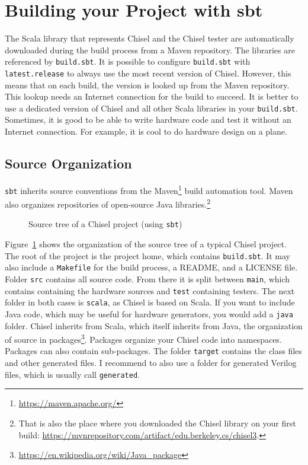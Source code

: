 \documentclass[%
    10pt,
    headinclude, footexclude,
    openright, %
    notitlepage,
    cleardoubleempty,
    headsepline,
    pointlessnumbers,
    bibtotoc, idxtotoc,
    ]{scrbook}
\newcommand{\code}[1]{{\lstinline[basicstyle=\small\ttfamily]{#1}}}
\newcommand{\myref}[2]{\href{#1}{#2}}
\renewcommand{\myref}[2]{{#2}{\footnote{\url{#1}}}}
\begin{document}
\section{Building your Project with sbt}


The Scala library that represents Chisel and the Chisel tester are automatically
downloaded during the build process from a Maven repository.
The libraries are referenced by \code{build.sbt}. It is possible to configure \code{build.sbt}
with \code{latest.release} to always use the most recent version of Chisel.
However, this means that on each build, the version is looked up from the Maven
repository. This lookup needs an Internet connection for the build to succeed.
It is better to use a dedicated version of Chisel and all other Scala libraries in your \code{build.sbt}.
Sometimes, it is good to be able to write hardware code and test it without an Internet connection.
For example, it is cool to do hardware design on a plane.

\subsection{Source Organization}


\code{sbt} inherits source conventions from the \myref{https://maven.apache.org/}{Maven}
build automation tool. Maven also organizes repositories of open-source Java libraries.\footnote{That is
also the place where you downloaded the Chisel library on your first build:
\url{https://mvnrepository.com/artifact/edu.berkeley.cs/chisel3}.}

\begin{figure}
\caption{Source tree of a Chisel project (using \code{sbt})}
\label{fig:folders}
\end{figure}

Figure~\ref{fig:folders} shows the organization of the source tree of a typical Chisel project.
The root of the project is the project home, which contains \code{build.sbt}.
It may also include a \code{Makefile} for the build process, a README, and a LICENSE file.
Folder \code{src} contains all source code. From there it is split between \code{main},
which contains containing the hardware sources and \code{test} containing testers.
The next folder in both cases is \code{scala}, as Chisel is based on Scala.
If you want to include Java code, which may be useful for hardware generators,
you would add a \code{java} folder.
Chisel inherits from Scala, which itself inherits from Java, the organization of source
in \myref{https://en.wikipedia.org/wiki/Java_package}{packages}.
Packages organize your Chisel code into namespaces. Packages can also contain
sub-packages.
The folder \code{target} contains the class files and other generated files.
I recommend to also use a folder for generated Verilog files, which is usually
call \code{generated}.
\end{document}

